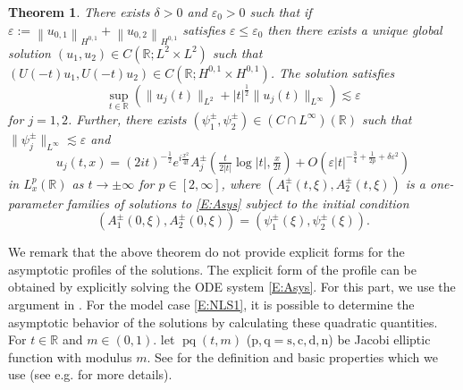 \documentclass[11pt,a4paper,oneside]{amsart}
\theoremstyle{plain}
\newtheorem{theorem}{Theorem}[section]
\theoremstyle{remark}
\numberwithin{equation}{section}
\newcommand{\R}{\mathbb{R}}
\newcommand{\norm}[1]{\left\lVert #1\right\rVert}
\newcommand{\tnorm}[1]{\lVert #1\rVert}
\def\({\left(}
\def\){\right)}
\def\le{\leqslant}
\newcommand{\eps}{\varepsilon}
\DeclareMathOperator{\pq}{pq}
\theoremstyle{definition}
\begin{document}
\begin{theorem}\label{T:main}
There exists $\delta>0$ and
$\eps_0>0$ such that if $\eps:= \norm{u_{0,1}}_{H^{0,1}} + \norm{u_{0,2}}_{H^{0,1}}$ satisfies $\eps \le \eps_0$ then there exists a unique global solution $(u_1,u_2) \in C(\R;L^2 \times L^2)$ such that $(U(-t)u_1,U(-t)u_2) \in C(\R;H^{0,1} \times H^{0,1})$.
The solution satisfies
\[
	\sup_{t\in \R} (\|u_j(t)\|_{L^2}+|t|^\frac12 \|u_j(t)\|_{L^\infty})
	\lesssim \eps
\]
for $j=1,2$.
Further, there exists $(\psi^\pm_1,\psi_2^\pm) \in (C\cap L^\infty)(\R)$
such that $\tnorm{\psi^\pm_j}_{L^\infty} \lesssim \eps$ and
\begin{equation}\label{E:mainap}
	u_j(t,x) = (2it)^{-\frac12} e^{i \frac{x^2}{4t}} A_j^\pm \(\tfrac{t}{2|t|} \log |t|, \tfrac{x}{2t}\)
	+O(\eps |t|^{-\frac{3}4 +\frac1{2p}+ \delta \eps^2})
\end{equation}
in $L^p_x(\R)$ as $t\to \pm\infty$ for $p \in [2,\infty]$,
where $(A_1^\pm(t,\xi),A_2^\pm(t,\xi))$ is a one-parameter families of solutions to \eqref{E:Asys} subject to the initial condition
\[
	(A_1^\pm(0,\xi),A_2^\pm(0,\xi))=(\psi^\pm_1(\xi),\psi_2^\pm(\xi)) .
\]
\end{theorem}
We remark that
the above theorem do not provide explicit forms for the asymptotic profiles of the solutions. The explicit form of the profile can be obtained by explicitly solving the ODE system \eqref{E:Asys}.
For this part, we use the argument in \cite{M}.
For the model case \eqref{E:NLS1}, it is possible to determine the asymptotic behavior of the solutions by calculating these quadratic quantities.
For $t\in \R$ and $m\in (0,1)$.
let $\pq(t,m) $ ($\mathrm{p},\mathrm{q}=\mathrm{s},\mathrm{c},\mathrm{d},\mathrm{n}$) be Jacobi elliptic function with modulus $m$. 
See \cite[Appendix A]{M3} for the definition and basic properties which we use (see e.g. \cite{BFBook} for more details).
\end{document}
